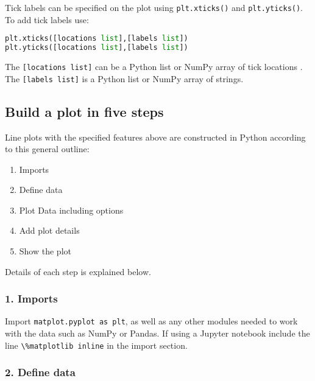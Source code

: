 \documentclass{book}
\providecommand{\tightlist}{%
      \setlength{\itemsep}{0pt}\setlength{\parskip}{0pt}}
\newcommand{\passthrough}[1]{#1}
\begin{document}
Tick labels can be specified on the plot using
\passthrough{\lstinline!plt.xticks()!} and
\passthrough{\lstinline!plt.yticks()!}. To add tick labels use:

\begin{lstlisting}[language=Python]
plt.xticks([locations list],[labels list])
plt.yticks([locations list],[labels list])
\end{lstlisting}

The \passthrough{\lstinline![locations list]!} can be a Python list or
NumPy array of tick locations . The
\passthrough{\lstinline![labels list]!} is a Python list or NumPy array
of strings.
    




    
        \hypertarget{build-a-plot-in-five-steps}{%
\subsection{Build a plot in five
steps}\label{build-a-plot-in-five-steps}}
    




    
        Line plots with the specified features above are constructed in Python
according to this general outline:

\begin{enumerate}
\def\labelenumi{\arabic{enumi}.}
\tightlist
\item
  Imports
\item
  Define data
\item
  Plot Data including options
\item
  Add plot details
\item
  Show the plot
\end{enumerate}

Details of each step is explained below.

\hypertarget{imports}{%
\subsubsection{1. Imports}\label{imports}}

Import \passthrough{\lstinline!matplot.pyplot as plt!}, as well as any
other modules needed to work with the data such as NumPy or Pandas. If
using a Jupyter notebook include the line
\passthrough{\lstinline!\%matplotlib inline!} in the import section.

\hypertarget{define-data}{%
\subsubsection{2. Define data}\label{define-data}}
\end{document}
